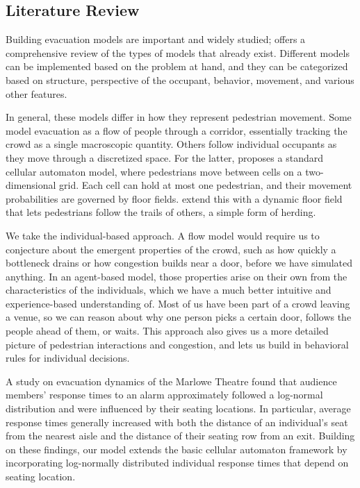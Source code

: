 \documentclass{article}
\begin{document}
\subsection{Literature Review}
Building evacuation models are important and widely studied;
\cite{nist2010} offers a comprehensive review of the types of models that already exist. Different models can be implemented based on the problem at hand, and they can be categorized based on structure, perspective of the occupant, behavior, movement, and various other features.

In general, these models differ in how they represent pedestrian movement. Some model evacuation as a flow of people through a corridor, essentially tracking the crowd as a single macroscopic quantity. Others follow individual occupants as they move through a discretized space. For the latter, \cite{burstedde2001} proposes a standard cellular automaton model, where pedestrians move between cells on a two-dimensional grid. Each cell can hold at most one pedestrian, and their movement probabilities are governed by floor fields. \cite{kirchner2002} extend this with a dynamic floor field that lets pedestrians follow the trails of others, a simple form of herding.

We take the individual-based approach. A flow model would require us to conjecture about the emergent properties of the crowd, such as how quickly a bottleneck drains or how congestion builds near a door, before we have simulated anything. In an agent-based model, those properties arise on their own from the characteristics of the individuals, which we have a much better intuitive and experience-based understanding of. Most of us have been part of a crowd leaving a venue, so we can reason about why one person picks a certain door, follows the people ahead of them, or waits. This approach also gives us a more detailed picture of pedestrian interactions and congestion, and lets us build in behavioral rules for individual decisions.

A study on evacuation dynamics of the Marlowe Theatre \cite{galea2017} found that audience members' response times to an alarm approximately followed a log-normal distribution and were influenced by their seating locations. In particular, average response times generally increased with both the distance of an individual's seat from the nearest aisle and the distance of their seating row from an exit. Building on these findings, our model extends the basic cellular automaton framework by incorporating log-normally distributed individual response times that depend on seating location.
\end{document}
